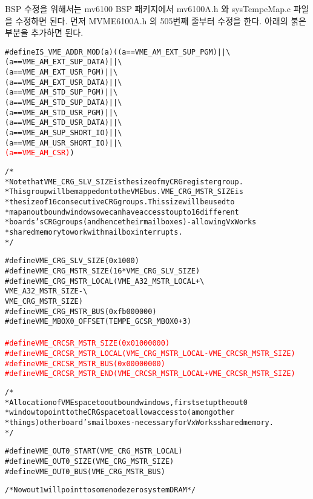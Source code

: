 \documentclass[11pt,a4paper]{article}
\begin{document}
BSP 수정을 위해서는 mv6100 BSP 패키지에서 mv6100A.h 와 sysTempeMap.c 파일을 수정하면 된다. 
먼저 MVME6100A.h 의 505번째 줄부터 수정을 한다. 아래의 붉은 부분을 추가하면 된다.
\begin{framed}
\begin{alltt}
#define IS_VME_ADDR_MOD(a) ((a == VME_AM_EXT_SUP_PGM)  || \verb|\| 
                            (a == VME_AM_EXT_SUP_DATA) || \verb|\|
                            (a == VME_AM_EXT_USR_PGM)  || \verb|\|
                            (a == VME_AM_EXT_USR_DATA) || \verb|\|
                            (a == VME_AM_STD_SUP_PGM)  || \verb|\|
                            (a == VME_AM_STD_SUP_DATA) || \verb|\|
                            (a == VME_AM_STD_USR_PGM)  || \verb|\|
                            (a == VME_AM_STD_USR_DATA) || \verb|\|
                            (a == VME_AM_SUP_SHORT_IO) || \verb|\|
                            (a == VME_AM_USR_SHORT_IO) || \verb|\|
                            \textcolor{red}{(a == VME_AM_CSR)})

/* 
 * Note that VME_CRG_SLV_SIZE is the size of my CRG register group.
 * This group will be mapped onto the VME bus.  VME_CRG_MSTR_SIZE is
 * the size of 16 consecutive CRG groups.  This size will be used to
 * map an outbound window so we can have access to up to 16 different
 * boards's CRG groups (and hence their mailboxes) - allowing VxWorks
 * shared memory to work with mailbox interrupts.
 */

#define VME_CRG_SLV_SIZE        (0x1000)
#define VME_CRG_MSTR_SIZE       (16 * VME_CRG_SLV_SIZE)
#define VME_CRG_MSTR_LOCAL      (VME_A32_MSTR_LOCAL + \verb|\|
                 VME_A32_MSTR_SIZE - \verb|\|
                 VME_CRG_MSTR_SIZE)
#define VME_CRG_MSTR_BUS        (0xfb000000)
#define VME_MBOX0_OFFSET	(TEMPE_GCSR_MBOX0 + 3)
\textcolor{red}{    
#define VME_CRCSR_MSTR_SIZE		(0x01000000)
#define VME_CRCSR_MSTR_LOCAL	(VME_CRG_MSTR_LOCAL - VME_CRCSR_MSTR_SIZE)
#define VME_CRCSR_MSTR_BUS		(0x00000000)
#define VME_CRCSR_MSTR_END		(VME_CRCSR_MSTR_LOCAL + VME_CRCSR_MSTR_SIZE)
}    

/*
 * Allocation of VME space to outbound windows, first set up the out0
 * window to point to the CRG space to allow access to (among other
 * things) other board's mailboxes - necessary for VxWorks shared memory.
 */

#define VME_OUT0_START		(VME_CRG_MSTR_LOCAL)
#define VME_OUT0_SIZE		(VME_CRG_MSTR_SIZE)
#define VME_OUT0_BUS            (VME_CRG_MSTR_BUS)

/* Now out1 will point to some node zero system DRAM */


\end{alltt}
\end{framed}
\end{document}
